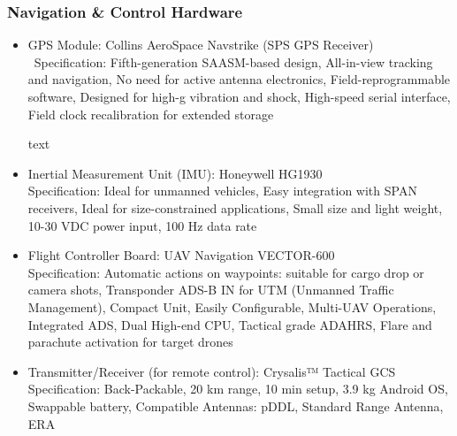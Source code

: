 \subsubsection{Navigation \& Control Hardware}
\begin{itemize}
\item GPS Module:
Collins AeroSpace Navstrike (SPS GPS Receiver) \
Specification: Fifth-generation SAASM-based design,
All-in-view tracking and navigation,
No need for active antenna electronics,
Field-reprogrammable software,
Designed for high-g vibration and shock,
High-speed serial interface,
Field clock recalibration for extended storage

text
\item Inertial Measurement Unit (IMU): 
Honeywell HG1930 \\
Specification: Ideal for unmanned vehicles,
Easy integration with SPAN receivers,
Ideal for size-constrained applications,
Small size and light weight,
10-30 VDC power input,
100 Hz data rate

\item Flight Controller Board:
UAV Navigation VECTOR-600 \\
Specification: Automatic actions on waypoints: suitable for cargo drop or camera shots, Transponder ADS-B IN for UTM (Unmanned Traffic Management), Compact Unit, Easily Configurable, Multi-UAV Operations, Integrated ADS, Dual High-end CPU, Tactical grade ADAHRS, Flare and parachute activation for target drones

\item Transmitter/Receiver (for remote control):
Crysalis™ Tactical GCS \\
Specification: Back-Packable, 20 km range, 10 min setup, 3.9 kg Android OS, Swappable battery, Compatible Antennas: pDDL, Standard Range Antenna, ERA
\end{itemize}

